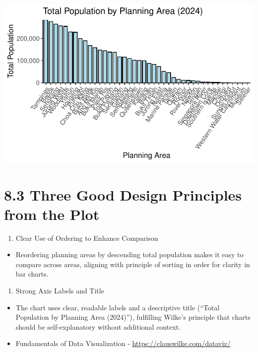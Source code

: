 \documentclass[
  letterpaper,
  DIV=11,
  numbers=noendperiod]{scrartcl}
\providecommand{\tightlist}{%
  \setlength{\itemsep}{0pt}\setlength{\parskip}{0pt}}\usepackage{longtable,booktabs,array}
\begin{document}
\includegraphics{Take-home_Ex01_files/figure-pdf/unnamed-chunk-21-1.pdf}

\section{8.3 Three Good Design Principles from the
Plot}\label{three-good-design-principles-from-the-plot}

\begin{enumerate}
\def\labelenumi{\arabic{enumi}.}
\tightlist
\item
  Clear Use of Ordering to Enhance Comparison
\end{enumerate}

\begin{itemize}
\tightlist
\item
  Reordering planning areas by descending total population makes it easy
  to compare across areas, aligning with principle of sorting in order
  for clarity in bar charts.
\end{itemize}

\begin{enumerate}
\def\labelenumi{\arabic{enumi}.}
\setcounter{enumi}{1}
\tightlist
\item
  Strong Axis Labels and Title
\end{enumerate}

\begin{itemize}
\item
  The chart uses clear, readable labels and a descriptive title (``Total
  Population by Planning Area (2024)''), fulfilling Wilke's principle
  that charts should be self-explanatory without additional context.
\item
  Fundamentals of Data Visualization -
  \url{https://clauswilke.com/dataviz/}
\end{itemize}
\end{document}
